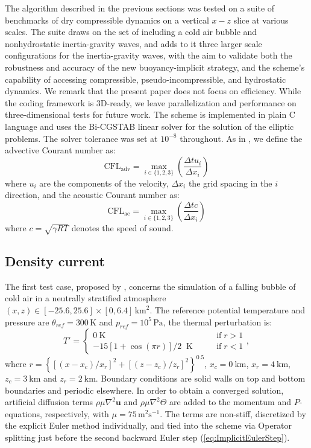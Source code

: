 \documentclass{ametsoc}
\theoremstyle{definition}
\newcommand{\eq}[1]{(\ref{#1})}
\newcommand{\dt}{\Delta t}
\newcommand{\dx}{{\Delta x}}
\begin{document}
The algorithm described in the previous sections was tested on a suite of benchmarks of dry compressible dynamics on a vertical $x-z$ slice at various scales. The suite draws on the set of \cite{Benacchio2014,BenacchioEtAl2014} including a cold air bubble and nonhydrostatic inertia-gravity waves, and adds to it three larger scale configurations for the inertia-gravity waves, with the aim to validate both the robustness and accuracy of the new buoyancy-implicit strategy, and the scheme's capability of accessing compressible, pseudo-incompressible, and hydrostatic dynamics. We remark that the present paper does not focus on efficiency. While the coding framework is 3D-ready, we leave parallelization and performance on three-dimensional tests for future work. The scheme is implemented in plain C language and uses the Bi-CGSTAB linear solver \citep{Vandervorst1992} for the solution of the elliptic problems. The solver tolerance was set at $10^{-8}$ throughout. As in \cite{BenacchioEtAl2014}, we define the advective Courant number as:
%
\begin{equation}
\textrm{CFL}_\textrm{adv} = \max\limits_{i \in \{1,2,3\}}\left(\frac{\dt u_i}{\dx_i}\right)
\end{equation}
%
where $u_i$ are the components of the velocity, $\dx_i$ the grid spacing in the $i$ direction, and the acoustic Courant number as:
%
\begin{equation}
\textrm{CFL}_\textrm{ac} = \max\limits_{i \in \{1,2,3\}}\left(\frac{\dt c}{\dx_i}\right)
\end{equation}
%
where $c=\sqrt{\gamma RT}$ denotes the speed of sound.

\subsection{Density current}

The first test case, proposed by \cite{StrakaEtAl1993}, concerns the simulation of a falling bubble of cold air in a neutrally stratified atmosphere $(x,z)\in[-25.6,25.6]\times[0,6.4]\,\textrm{km}^2$. The reference potential temperature and pressure  are $\theta_{ref}=300\,\textrm{K}$ and $p_{ref}=10^5\,\textrm{Pa}$, the thermal perturbation is:
%
\begin{equation}
 T'=\begin{cases}
           0~\textrm{K} \qquad&\textrm{if}\;r>1\\
	   -15\left[1+\cos(\pi r)\right]/2 \;\;\textrm{K}\qquad&\textrm{if}\;r<1   
          \end{cases},
\end{equation} 
%
where $r=\left\{[(x-x_c)/x_r]^2+[(z-z_c)/z_r]^2\right\}^{0.5}$, $x_c=0~\textrm{km}$, $x_r=4~\textrm{km}$, $z_c=3~\textrm{km}$ and $z_r=2~\textrm{km}$. 
%
Boundary conditions are solid walls on top and bottom boundaries and periodic elsewhere. In order to obtain a converged solution, artificial diffusion terms $\rho\mu\nabla^2\mathbf{u}$ and
$\rho\mu\nabla^2\Theta$ are added to the momentum and $P$-equations, respectively, with $\mu=75\,\textrm{m$^2$s$^{-1}$}$. The terms are non-stiff, discretized by the explicit Euler method individually, and tied into the scheme via Operator splitting just before the second backward
Euler step \eq{eq:ImplicitEulerStep}.
\end{document}
